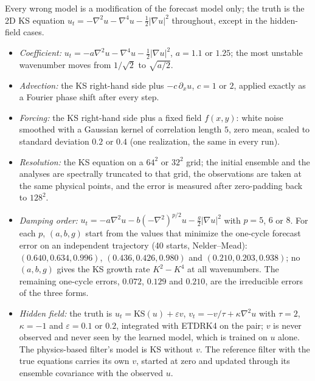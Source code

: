  Every wrong model is a modification of the forecast model only; the truth is the
2D KS equation $u_t=-\nabla^2u-\nabla^4u-\tfrac12|\nabla u|^2$ throughout, except in the hidden-field cases.
\begin{itemize}
\item \emph{Coefficient:} $u_t=-a\nabla^2u-\nabla^4u-\tfrac12|\nabla u|^2$, $a=1.1$ or $1.25$; the most unstable
  wavenumber moves from $1/\sqrt2$ to $\sqrt{a/2}$.
\item \emph{Advection:} the KS right-hand side plus $-c\,\partial_xu$, $c=1$ or $2$, applied exactly as a Fourier
  phase shift after every step.
\item \emph{Forcing:} the KS right-hand side plus a fixed field $f(x,y)$: white noise smoothed with a
  Gaussian kernel of correlation length $5$, zero mean, scaled to standard deviation $0.2$ or $0.4$ (one
  realization, the same in every run).
\item \emph{Resolution:} the KS equation on a $64^2$ or $32^2$ grid; the initial ensemble and the analyses
  are spectrally truncated to that grid, the observations are taken at the same physical points, and
  the error is measured after zero-padding back to $128^2$.
\item \emph{Damping order:} $u_t=-a\nabla^2u-b(-\nabla^2)^{p/2}u-\tfrac g2|\nabla u|^2$ with $p=5$, $6$ or $8$. For each
  $p$, $(a,b,g)$ start from the values that minimize the one-cycle forecast error on an independent
  trajectory (40 starts, Nelder--Mead): $(0.640, 0.634, 0.996)$, $(0.436, 0.426, 0.980)$ and
  $(0.210, 0.203, 0.938)$; no $(a,b,g)$ gives the KS growth rate $K^2-K^4$ at all wavenumbers. The
  remaining one-cycle errors, $0.072$, $0.129$ and $0.210$, are the irreducible errors of the three forms.
\item \emph{Hidden field:} the truth is $u_t=\mathrm{KS}(u)+\varepsilon v$, $v_t=-v/\tau+\kappa\nabla^2u$ with $\tau=2$,
  $\kappa=-1$ and $\varepsilon=0.1$ or $0.2$, integrated with ETDRK4 on the pair; $v$ is never observed and never
  seen by the learned model, which is trained on $u$ alone. The physics-based filter's model is KS
  without $v$. The reference filter with the true equations carries its own $v$, started at zero and
  updated through its ensemble covariance with the observed $u$.
\end{itemize}

